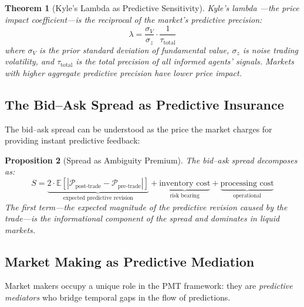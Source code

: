 \documentclass[12pt,a4paper]{article}
\newtheorem{theorem}{Theorem}[section]
\newtheorem{proposition}[theorem]{Proposition}
\theoremstyle{definition}
\newcommand{\E}{\mathbb{E}}
\newcommand{\PP}{\mathcal{P}}
\begin{document}
\begin{theorem}[Kyle's Lambda as Predictive Sensitivity]\label{thm:kyle_lambda}
Kyle's lambda \citep{kyle1985}---the price impact coefficient---is the reciprocal of the market's predictive precision:
\begin{equation}\label{eq:kyle_pmt}
    \lambda = \frac{\sigma_V}{\sigma_z} \cdot \frac{1}{\tau_{\text{total}}}
\end{equation}
where $\sigma_V$ is the prior standard deviation of fundamental value, $\sigma_z$ is noise trading volatility, and $\tau_{\text{total}}$ is the total precision of all informed agents' signals. Markets with higher aggregate predictive precision have lower price impact.
\end{theorem}

\subsection{The Bid--Ask Spread as Predictive Insurance}

The bid--ask spread can be understood as the price the market charges for providing instant predictive feedback:

\begin{proposition}[Spread as Ambiguity Premium]\label{prop:spread}
The bid--ask spread decomposes as:
\begin{equation}\label{eq:spread_decomp}
    S = \underbrace{2 \cdot \E[|\PP_{\text{post-trade}} - \PP_{\text{pre-trade}}|]}_{\text{expected predictive revision}} + \underbrace{\text{inventory cost}}_{\text{risk bearing}} + \underbrace{\text{processing cost}}_{\text{operational}}
\end{equation}
The first term---the expected magnitude of the predictive revision caused by the trade---is the informational component of the spread and dominates in liquid markets.
\end{proposition}

\subsection{Market Making as Predictive Mediation}

Market makers occupy a unique role in the PMT framework: they are \emph{predictive mediators} who bridge temporal gaps in the flow of predictions.
\end{document}

